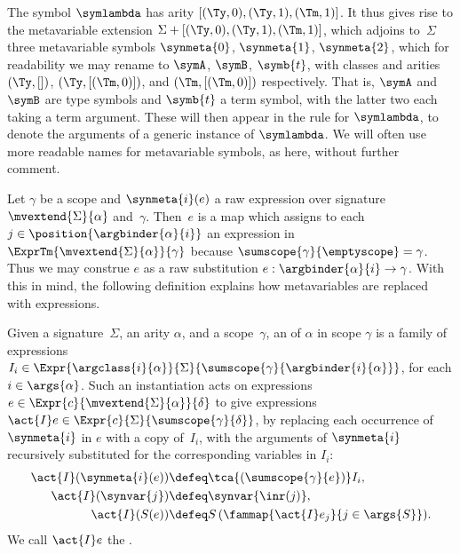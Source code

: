 \begin{example}
  The symbol $\symlambda$ has arity
  $
    [(\Ty,0), (\Ty,1), (\Tm,1)]
  $.
  It thus gives rise to the metavariable extension $\Sigma + [(\Ty,0), (\Ty,1), (\Tm,1)]$, which adjoins to~$\Sigma$ three metavariable symbols $\synmeta{0}$, $\synmeta{1}$, $\synmeta{2}$, which for readability we may rename to $\symA$, $\symB$, $\symb{t}$, with classes and arities $(\Ty, [])$, $(\Ty, [(\Tm, 0)])$, and $(\Tm, [(\Tm,0)])$ respectively.
  That is, $\symA$ and $\symB$ are type symbols and $\symb{t}$ a term symbol, with the latter two each taking a term argument.
  These will then appear in the rule for $\symlambda$, to denote the arguments of a generic instance of $\symlambda$.
  We will often use more readable names for metavariable symbols, as here, without further comment.
\end{example}

Let $\gamma$ be a scope and $\synmeta{i}(e)$ a raw expression over signature $\mvextend{\Sigma}{\alpha}$ and~$\gamma$.
Then~$e$ is a map which assigns to each $j \in \position{\argbinder{\alpha}{i}}$ an expression in $\ExprTm{\mvextend{\Sigma}{\alpha}}{\gamma}$ because $\sumscope{\gamma}{\emptyscope} = \gamma$.
Thus we may construe $e$ as a raw substitution $e : \argbinder{\alpha}{i} \to \gamma$.
With this in mind, the following definition explains how metavariables are replaced with expressions.

\begin{definition}
  \label{def:instantiation}%
  Given a signature~$\Sigma$, an arity $\alpha$, and a scope~$\gamma$, an  of $\alpha$ in scope $\gamma$ is a family of expressions $I_i \in \Expr{\argclass{i}{\alpha}}{\Sigma}{\sumscope{\gamma}{\argbinder{i}{\alpha}}}$, for each $i \in \args{\alpha}$.
  Such an instantiation acts on expressions $e \in \Expr{c}{\mvextend{\Sigma}{\alpha}}{\delta}$ to give expressions $\act{I} e \in \Expr{c}{\Sigma}{\sumscope{\gamma}{\delta}}$, by
replacing each occurrence of $\synmeta{i}$ in $e$ with a copy of~$I_i$, with the arguments of $\synmeta{i}$ recursively substituted for the corresponding variables in $I_i$:
%
\begin{align*}
  \act{I} (\synmeta{i}(e)) &\defeq \tca{(\sumscope{\gamma}{e})} I_i, \\
  \act{I} (\synvar{j})     &\defeq \synvar{\inr(j)}, \\
  \act{I} (S(e))           &\defeq S \, (\fammap{\act{I} e_j}{j \in \args{S}}).
\end{align*}
  We call $\act{I}e$ the .
\end{definition}

